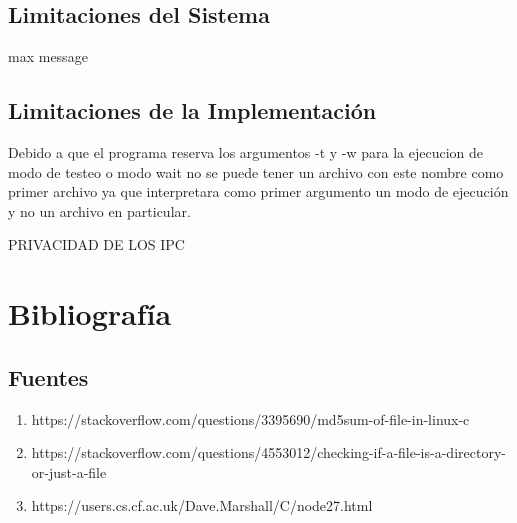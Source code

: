 \documentclass[10pt,a4paper]{report}
\begin{document}
\section{Limitaciones del Sistema}
max message

\section{Limitaciones de la Implementación}
Debido a que el programa reserva los argumentos -t y -w para la ejecucion de modo de testeo o modo wait no se puede tener un archivo con este nombre como primer archivo ya que interpretara como primer argumento un modo de ejecución y no un archivo en particular.

PRIVACIDAD DE LOS IPC


\chapter{Bibliografía}
\section{Fuentes}
\begin{enumerate}
\item https://stackoverflow.com/questions/3395690/md5sum-of-file-in-linux-c
\item https://stackoverflow.com/questions/4553012/checking-if-a-file-is-a-directory-or-just-a-file
\item https://users.cs.cf.ac.uk/Dave.Marshall/C/node27.html
\end{enumerate}
\end{document}
